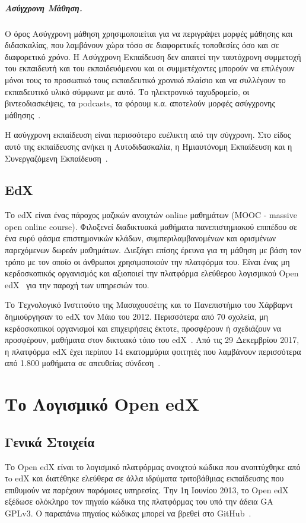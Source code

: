 \documentclass[12pt]{report}
\begin{document}
  \paragraph{Ασύγχρονη Μάθηση.} Ο όρος Ασύγχρονη μάθηση χρησιμοποιείται για να περιγράψει μορφές μάθησης και διδασκαλίας, που λαμβάνουν χώρα τόσο σε διαφορετικές τοποθεσίες όσο και σε διαφορετικό χρόνο. Η Ασύγχρονη Εκπαίδευση δεν απαιτεί την ταυτόχρονη συμμετοχή του εκπαιδευτή και του εκπαιδευόμενου και οι συμμετέχοντες μπορούν να επιλέγουν μόνοι τους το προσωπικό τους εκπαιδευτικό χρονικό πλαίσιο και να συλλέγουν το εκπαιδευτικό υλικό σύμφωνα με αυτό. Το ηλεκτρονικό ταχυδρομείο, οι βιντεοδιασκέψεις, τα \textlatin{podcasts}, τα φόρουμ κ.α. αποτελούν μορφές ασύγχρονης μάθησης~\cite{hrastinski}.

Η ασύγχρονη εκπαίδευση είναι περισσότερο ευέλικτη από την σύγχρονη. Στο είδος αυτό της εκπαίδευσης ανήκει η Αυτοδιδασκαλία, η Ημιαυτόνομη Εκπαίδευση και η Συνεργαζόμενη Εκπαίδευση~\cite{wikipedia_2018_1}.

\section{\textlatin{EdX}}
Το \textlatin{edX} είναι ένας πάροχος μαζικών ανοιχτών \textlatin{online} μαθημάτων (\textlatin{MOOC - massive open online course}). Φιλοξενεί διαδικτυακά μαθήματα πανεπιστημιακού επιπέδου σε ένα ευρύ φάσμα επιστημονικών κλάδων, συμπεριλαμβανομένων και ορισμένων παρεχόμενων δωρεάν μαθημάτων. Διεξάγει επίσης έρευνα για τη μάθηση με βάση τον τρόπο με τον οποίο οι άνθρωποι χρησιμοποιούν την πλατφόρμα του. Είναι ένας μη κερδοσκοπικός οργανισμός και αξιοποιεί την πλατφόρμα ελεύθερου λογισμικού \textlatin{Open edX}~\cite{edx_2018} για την παροχή των υπηρεσιών του.

Το Τεχνολογικό Ινστιτούτο της Μασαχουσέτης και το Πανεπιστήμιο του Χάρβαρντ δημιούργησαν το \textlatin{edX} τον Μάιο του 2012. Περισσότερα από 70 σχολεία, μη κερδοσκοπικοί οργανισμοί και επιχειρήσεις έκτοτε, προσφέρουν ή σχεδιάζουν να προσφέρουν, μαθήματα στον δικτυακό τόπο του \textlatin{edX}~\cite{edx_2019_1}. Από τις 29 Δεκεμβρίου 2017, η πλατφόρμα \textlatin{edX} έχει περίπου 14 εκατομμύρια φοιτητές που λαμβάνουν περισσότερα από 1.800 μαθήματα σε απευθείας σύνδεση~\cite{report_2018}.


\chapter{Το Λογισμικό \textlatin{Open edX}}\label{ch2}
\section{Γενικά Στοιχεία}
Το \textlatin{Open edX} είναι το λογισμικό πλατφόρμας ανοιχτού κώδικα που αναπτύχθηκε από τo \textlatin{edX} και διατέθηκε ελεύθερα σε άλλα ιδρύματα τριτοβάθμιας εκπαίδευσης που επιθυμούν να παρέχουν παρόμοιες υπηρεσίες. Την 1η Ιουνίου 2013, το \textlatin{Open edX} εξέδωσε ολόκληρο τον πηγαίο κώδικα της πλατφόρμας του υπό την άδεια \textlatin{GA GPLv3}. Ο παραπάνω πηγαίος κώδικας μπορεί να βρεθεί στο \textlatin{GitHub}~\cite{edx_2019_2}.
\end{document}
